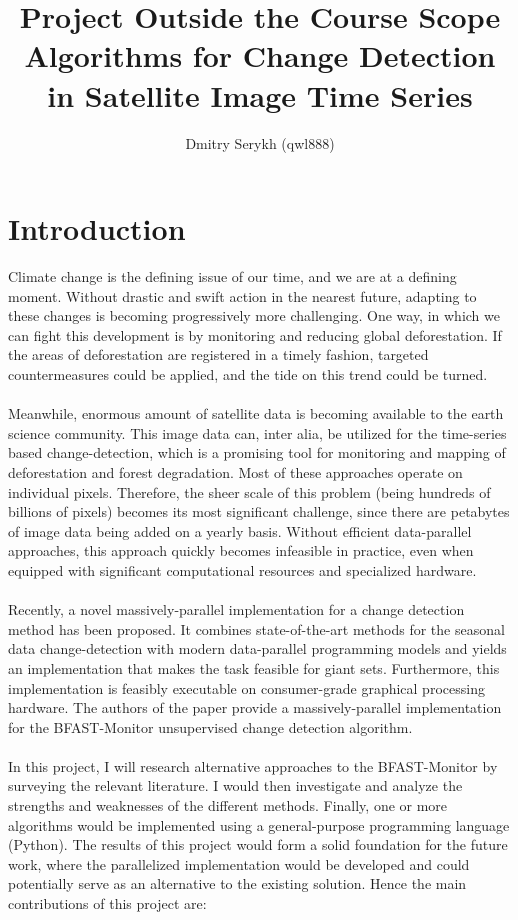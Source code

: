 \documentclass[a4paper]{article}
\title{
  \huge Project Outside the Course Scope \\
  \large Algorithms for Change Detection in Satellite Image Time Series
}
\author{Dmitry Serykh (qwl888)}
\begin{document}
\maketitle
\section{Introduction}
Climate change is the defining issue of our time, and we are at a defining
moment. Without drastic and swift action in the nearest future, adapting to
these changes is becoming progressively more challenging. One way, in which we
can fight this development is by monitoring and reducing global deforestation.
If the areas of deforestation are registered in a timely fashion, targeted
countermeasures could be applied, and the tide on this trend could be turned. \\\\
Meanwhile, enormous amount of satellite data is becoming available to the earth
science community. This image data can, inter alia, be utilized for the
time-series based change-detection, which is a promising tool for monitoring and
mapping of deforestation and forest degradation. Most of these approaches
operate on individual pixels. Therefore, the sheer scale of this problem (being
hundreds of billions of pixels) becomes its most significant challenge, since
there are petabytes of image data being added on a yearly basis. Without
efficient data-parallel approaches, this approach quickly becomes infeasible in
practice, even when equipped with significant computational resources and
specialized hardware. \\\\
Recently, a novel massively-parallel implementation for a
change detection method has been proposed. It combines state-of-the-art methods
for the seasonal data change-detection with modern data-parallel programming
models and yields an implementation that makes the task feasible for giant sets.
Furthermore, this implementation is feasibly executable on consumer-grade
graphical processing hardware. The authors of the paper provide a
massively-parallel implementation for the BFAST-Monitor unsupervised change
detection algorithm. \\\\
In this project, I will research alternative approaches to
the BFAST-Monitor by surveying the relevant literature. I would then investigate
and analyze the strengths and weaknesses of the different methods. Finally, one
or more algorithms would be implemented using a general-purpose programming
language (Python). The results of this project would form a solid foundation for
the future work, where the parallelized implementation would be developed and
could potentially serve as an alternative to the existing solution. Hence the main
contributions of this project are:
\end{document}
